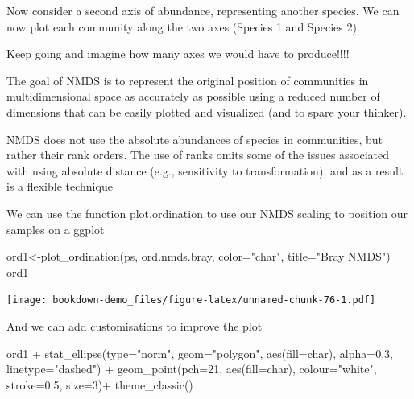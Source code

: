\documentclass[
]{book}
\newenvironment{Shaded}{\begin{snugshade}}{\end{snugshade}}
\newcommand{\AttributeTok}[1]{\textcolor[rgb]{0.77,0.63,0.00}{#1}}
\newcommand{\DecValTok}[1]{\textcolor[rgb]{0.00,0.00,0.81}{#1}}
\newcommand{\FloatTok}[1]{\textcolor[rgb]{0.00,0.00,0.81}{#1}}
\newcommand{\FunctionTok}[1]{\textcolor[rgb]{0.00,0.00,0.00}{#1}}
\newcommand{\NormalTok}[1]{#1}
\newcommand{\OtherTok}[1]{\textcolor[rgb]{0.56,0.35,0.01}{#1}}
\newcommand{\SpecialCharTok}[1]{\textcolor[rgb]{0.00,0.00,0.00}{#1}}
\newcommand{\StringTok}[1]{\textcolor[rgb]{0.31,0.60,0.02}{#1}}
\begin{document}
Now consider a second axis of abundance, representing another species. We can now plot each community along the two axes (Species 1 and Species 2).

Keep going and imagine how many axes we would have to produce!!!!

The goal of NMDS is to represent the original position of communities in multidimensional space as accurately as possible using a reduced number of dimensions that can be easily plotted and visualized (and to spare your thinker).

NMDS does not use the absolute abundances of species in communities, but rather their rank orders. The use of ranks omits some of the issues associated with using absolute distance (e.g., sensitivity to transformation), and as a result is a flexible technique

We can use the function plot.ordination to use our NMDS scaling to position our samples on a ggplot

\begin{Shaded}
\begin{Highlighting}[]
\NormalTok{ord1}\OtherTok{\textless{}{-}}\FunctionTok{plot\_ordination}\NormalTok{(ps, ord.nmds.bray, }\AttributeTok{color=}\StringTok{"char"}\NormalTok{, }\AttributeTok{title=}\StringTok{"Bray NMDS"}\NormalTok{)}
\NormalTok{ord1}
\end{Highlighting}
\end{Shaded}

\texttt{[image: bookdown-demo\_files/figure-latex/unnamed-chunk-76-1.pdf]}

And we can add customisations to improve the plot

\begin{Shaded}
\begin{Highlighting}[]
\NormalTok{ord1 }\SpecialCharTok{+} \FunctionTok{stat\_ellipse}\NormalTok{(}\AttributeTok{type=}\StringTok{"norm"}\NormalTok{,}
                    \AttributeTok{geom=}\StringTok{"polygon"}\NormalTok{,}
                    \FunctionTok{aes}\NormalTok{(}\AttributeTok{fill=}\NormalTok{char),}
                    \AttributeTok{alpha=}\FloatTok{0.3}\NormalTok{,}
                    \AttributeTok{linetype=}\StringTok{"dashed"}\NormalTok{) }\SpecialCharTok{+}
     \FunctionTok{geom\_point}\NormalTok{(}\AttributeTok{pch=}\DecValTok{21}\NormalTok{, }\FunctionTok{aes}\NormalTok{(}\AttributeTok{fill=}\NormalTok{char), }\AttributeTok{colour=}\StringTok{"white"}\NormalTok{, }\AttributeTok{stroke=}\FloatTok{0.5}\NormalTok{, }\AttributeTok{size=}\DecValTok{3}\NormalTok{)}\SpecialCharTok{+}
        \FunctionTok{theme\_classic}\NormalTok{()}
\end{Highlighting}
\end{Shaded}
\end{document}
